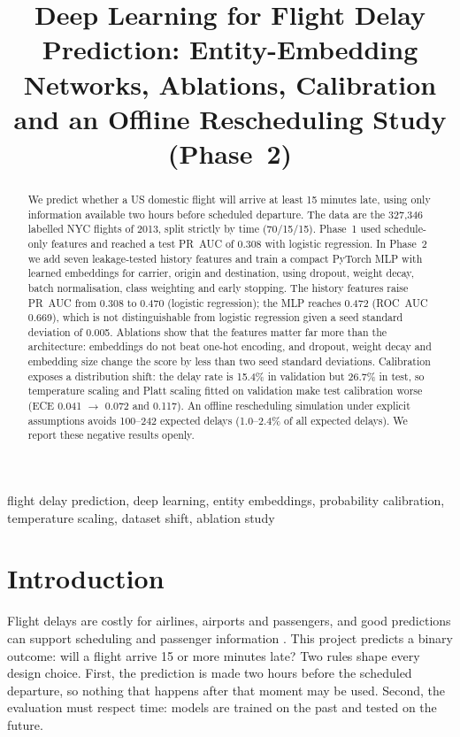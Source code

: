 \documentclass[conference]{IEEEtran}
\begin{document}
\title{Deep Learning for Flight Delay Prediction: Entity-Embedding Networks, Ablations, Calibration and an Offline Rescheduling Study (Phase~2)}

\author{
\IEEEauthorblockN{[Member 1], [Member 2], [Member 3], [Member 4], [Member 5]}
}

\maketitle

\begin{abstract}
We predict whether a US domestic flight will arrive at least 15 minutes late, using only information available two hours before scheduled departure. The data are the 327,346 labelled NYC flights of 2013, split strictly by time (70/15/15). Phase~1 used schedule-only features and reached a test PR~AUC of 0.308 with logistic regression. In Phase~2 we add seven leakage-tested history features and train a compact PyTorch MLP with learned embeddings for carrier, origin and destination, using dropout, weight decay, batch normalisation, class weighting and early stopping. The history features raise PR~AUC from 0.308 to 0.470 (logistic regression); the MLP reaches 0.472 (ROC~AUC 0.669), which is not distinguishable from logistic regression given a seed standard deviation of 0.005. Ablations show that the features matter far more than the architecture: embeddings do not beat one-hot encoding, and dropout, weight decay and embedding size change the score by less than two seed standard deviations. Calibration exposes a distribution shift: the delay rate is 15.4\% in validation but 26.7\% in test, so temperature scaling and Platt scaling fitted on validation make test calibration worse (ECE 0.041 $\rightarrow$ 0.072 and 0.117). An offline rescheduling simulation under explicit assumptions avoids 100--242 expected delays (1.0--2.4\% of all expected delays). We report these negative results openly.
\end{abstract}

\begin{IEEEkeywords}
flight delay prediction, deep learning, entity embeddings, probability calibration, temperature scaling, dataset shift, ablation study
\end{IEEEkeywords}

\section{Introduction}
Flight delays are costly for airlines, airports and passengers, and good predictions can support scheduling and passenger information \cite{carvalho}. This project predicts a binary outcome: will a flight arrive 15 or more minutes late? Two rules shape every design choice. First, the prediction is made two hours before the scheduled departure, so nothing that happens after that moment may be used. Second, the evaluation must respect time: models are trained on the past and tested on the future.
\end{document}
